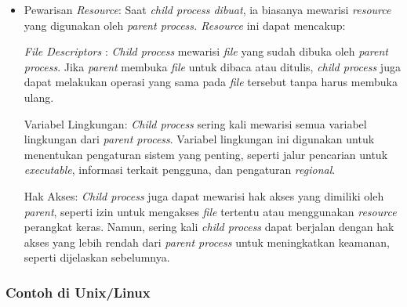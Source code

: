 \documentclass[12pt]{article}
\begin{document}
\begin{itemize}
    \item {Pewarisan \textit{Resource}:} Saat \textit{child process dibuat}, ia biasanya mewarisi \textit{resource} yang digunakan oleh \textit{parent process. Resource} ini dapat mencakup:

    {\textit{File Descriptors} :} \textit{Child process} mewarisi \textit{file} yang sudah dibuka oleh \textit{parent process}. Jika \textit{parent} membuka \textit{file} untuk dibaca atau ditulis, \textit{child process} juga dapat melakukan operasi yang sama pada \textit{file} tersebut tanpa harus membuka ulang.
    
    {Variabel Lingkungan:} \textit{Child process} sering kali mewarisi semua variabel lingkungan dari \textit{parent process}. Variabel lingkungan ini digunakan untuk menentukan pengaturan sistem yang penting, seperti jalur pencarian untuk \textit{executable}, informasi terkait pengguna, dan pengaturan \textit{regional}.
   
    {Hak Akses:} \textit{Child process} juga dapat mewarisi hak akses yang dimiliki oleh \textit{parent}, seperti izin untuk mengakses \textit{file} tertentu atau menggunakan \textit{resource} perangkat keras. Namun, sering kali \textit{child process} dapat berjalan dengan hak akses yang lebih rendah dari \textit{parent process} untuk meningkatkan keamanan, seperti dijelaskan sebelumnya.
\end{itemize}

\subsubsection{Contoh di Unix/Linux}
\end{document}
